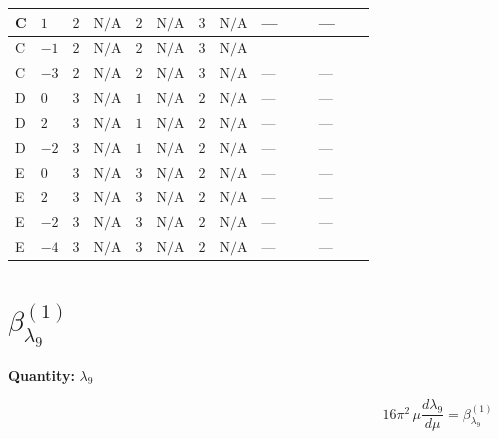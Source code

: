 \documentclass[8pt]{article}
\begin{document}
\begin{landscape}
\begin{longtable}{@{}llcccccc >{\raggedright\arraybackslash}p{0.21\linewidth} >{\raggedright\arraybackslash}p{0.21\linewidth}@{}}
\midrule
C & $1$ & $2$ & $\text{N/A}$ & $2$ & $\text{N/A}$ & $3$ & $\text{N/A}$ & --- & --- \\
\midrule
C & $-1$ & $2$ & $\text{N/A}$ & $2$ & $\text{N/A}$ & $3$ & $\text{N/A}$ & \scriptsize\adjustbox{max width=\linewidth}{$\begin{gathered} +{\lambda_{HS_1}^{(A)}} \left(\frac{{\lambda_{H H^\dagger S_1^\dagger S_2^\dagger}^{\rm Cross}}}{2}+\frac{{\lambda_{X_{17}}^{(1)}}}{2}\right)\end{gathered}$} & \scriptsize\adjustbox{max width=\linewidth}{$\begin{gathered} +12 {\lambda_{S_1}^{(1)}} {\lambda_{11}}\end{gathered}$} \\
\midrule
C & $-3$ & $2$ & $\text{N/A}$ & $2$ & $\text{N/A}$ & $3$ & $\text{N/A}$ & --- & --- \\
\midrule
D & $0$ & $3$ & $\text{N/A}$ & $1$ & $\text{N/A}$ & $2$ & $\text{N/A}$ & --- & --- \\
\midrule
D & $2$ & $3$ & $\text{N/A}$ & $1$ & $\text{N/A}$ & $2$ & $\text{N/A}$ & --- & --- \\
\midrule
D & $-2$ & $3$ & $\text{N/A}$ & $1$ & $\text{N/A}$ & $2$ & $\text{N/A}$ & --- & --- \\
\midrule
E & $0$ & $3$ & $\text{N/A}$ & $3$ & $\text{N/A}$ & $2$ & $\text{N/A}$ & --- & --- \\
\midrule
E & $2$ & $3$ & $\text{N/A}$ & $3$ & $\text{N/A}$ & $2$ & $\text{N/A}$ & --- & --- \\
\midrule
E & $-2$ & $3$ & $\text{N/A}$ & $3$ & $\text{N/A}$ & $2$ & $\text{N/A}$ & --- & --- \\
\midrule
E & $-4$ & $3$ & $\text{N/A}$ & $3$ & $\text{N/A}$ & $2$ & $\text{N/A}$ & --- & --- \\
\midrule
\bottomrule
\end{longtable}
\clearpage
\section*{$\beta_{\lambda_{9}}^{(1)}$}
\noindent\textbf{Quantity: }$\lambda_{9}$\par\smallskip
\[16\pi^2\,\mu\frac{d \lambda_{9}}{d\mu}=\beta_{\lambda_{9}}^{(1)}\]

\end{landscape}
\end{document}
